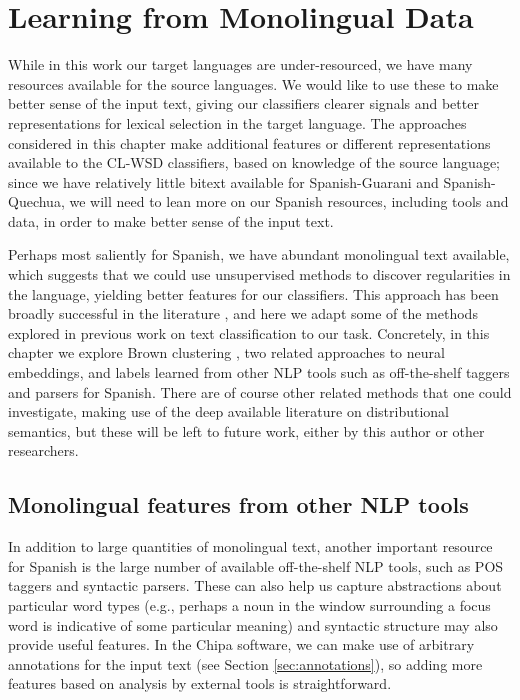 \chapter{Learning from Monolingual Data}
\label{chap:monolingual}
While in this work our target languages are under-resourced, we have many
resources available for the source languages. We would like to use these to make
better sense of the input text, giving our classifiers clearer signals and
better representations for lexical selection in the target language.  The
approaches considered in this chapter make additional features or different
representations available to the CL-WSD classifiers, based on knowledge of the
source language; since we have relatively little bitext available for
Spanish-Guarani and Spanish-Quechua, we will need to lean more on our Spanish
resources, including tools and data, in order to make better sense of the input
text.

Perhaps most saliently for Spanish, we have abundant monolingual text
available, which suggests that we could use unsupervised methods to discover
regularities in the language, yielding better features for our classifiers.
This approach has been broadly successful in the literature
\cite{turian-ratinov-bengio:2010:ACL}
, and here we adapt some of the methods explored in previous work on text
classification to our task. Concretely, in this chapter we explore Brown
clustering \cite{brown1992class}, two related approaches to neural embeddings,
and labels learned from other NLP tools such as off-the-shelf taggers and
parsers for Spanish. There are of course other related methods that one could
investigate, making use of the deep available literature on distributional
semantics, but these will be left to future work, either by this author or
other researchers.

\section{Monolingual features from other NLP tools}
In addition to large quantities of monolingual text, another important resource
for Spanish is the large number of available off-the-shelf NLP tools, such as
POS taggers and syntactic parsers. These can also help us capture abstractions
about particular word types (e.g., perhaps a noun in the window surrounding a
focus word is indicative of some particular meaning) and syntactic structure
may also provide useful features.  In the Chipa software, we can make use of
arbitrary annotations for the input text (see Section \ref{sec:annotations}),
so adding more features based on analysis by external tools is straightforward.

